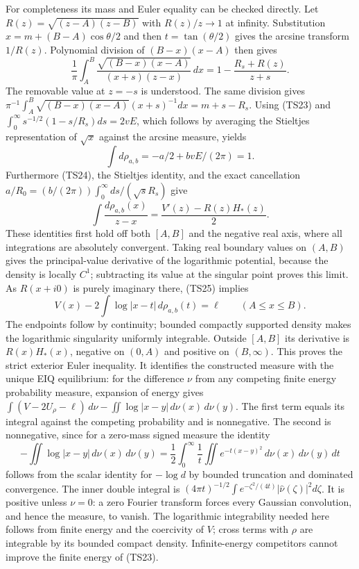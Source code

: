 \documentclass[11pt]{article}
\newcommand{\dd}{\,d}
\begin{document}
For completeness its mass and Euler equality can be checked directly.
Let $R(z)=\sqrt{(z-A)(z-B)}$ with $R(z)/z\to1$ at infinity.
Substitution $x=m+(B-A)\cos\theta/2$ and then
$t=\tan(\theta/2)$ gives the arcsine transform $1/R(z)$.
Polynomial division of $(B-x)(x-A)$ then gives
\begin{equation}\tag{TS24}
 \frac1\pi\int_A^B\frac{\sqrt{(B-x)(x-A)}}{(x+s)(z-x)}\dd x
 =1-\frac{R_s+R(z)}{z+s}.
\end{equation}
The removable value at $z=-s$ is understood. The same division gives
$\pi^{-1}\int_A^B\sqrt{(B-x)(x-A)}(x+s)^{-1}dx=m+s-R_s$.
Using (TS23) and $\int_0^\infty s^{-1/2}(1-s/R_s)ds=2vE$,
which follows by averaging the Stieltjes representation of $\sqrt x$
against the arcsine measure, yields
\[
 \int d\rho_{a,b}=-a/2+bvE/(2\pi)=1.
\]
Furthermore (TS24), the Stieltjes identity, and the exact cancellation
$a/R_0=(b/(2\pi))\int_0^\infty ds/(\sqrt sR_s)$ give
\begin{equation}\tag{TS25}
 \int\frac{d\rho_{a,b}(x)}{z-x}
 =\frac{V'(z)-R(z)H_*(z)}2.
\end{equation}
These identities first hold off both $[A,B]$ and the negative real
axis, where all integrations are absolutely convergent. Taking real
boundary values on $(A,B)$ gives the principal-value derivative
of the logarithmic potential, because the density is locally $C^1$;
subtracting its value at the singular point proves this limit.
As $R(x+i0)$ is purely imaginary there, (TS25) implies
\begin{equation}\tag{TS26}
 V(x)-2\int\log|x-t|\dd\rho_{a,b}(t)=\ell\qquad(A\leq x\leq B).
\end{equation}
The endpoints follow by continuity; bounded compactly supported
density makes the logarithmic singularity uniformly integrable.
Outside $[A,B]$ its derivative is $R(x)H_*(x)$, negative on $(0,A)$
and positive on $(B,\infty)$. This proves the strict exterior Euler
inequality. It identifies the constructed measure with the unique
EIQ equilibrium: for the difference $\nu$ from any competing finite
energy probability measure, expansion of energy gives
$\int(V-2U_\rho-\ell)\dd\nu-\iint\log|x-y|\dd\nu(x)\dd\nu(y)$.
The first term equals its integral against the competing probability
and is nonnegative. The second is nonnegative, since for a zero-mass
signed measure the identity
\[
 -\iint\log|x-y|\dd\nu(x)\dd\nu(y)
 =\frac12\int_0^\infty\frac1t
       \iint e^{-t(x-y)^2}\dd\nu(x)\dd\nu(y)\dd t
\]
follows from the scalar identity for $-\log d$ by bounded truncation
and dominated convergence. The inner double integral is
$(4\pi t)^{-1/2}\int e^{-\zeta^2/(4t)}|\widehat\nu(\zeta)|^2d\zeta$.
It is positive unless $\nu=0$: a zero Fourier transform forces every
Gaussian convolution, and hence the measure, to vanish. The
logarithmic integrability needed here follows from finite energy and
the coercivity of $V$; cross terms with $\rho$ are integrable by its
bounded compact density. Infinite-energy competitors cannot improve
the finite energy of (TS23).
\end{document}
